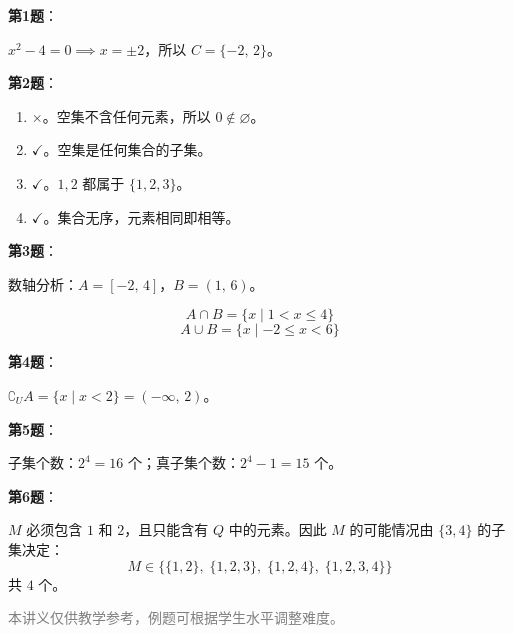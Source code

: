 \documentclass[12pt, a4paper]{ctexart}
\begin{document}
\begin{knowledgebox}[参考答案]
\textbf{第1题}：

$x^2 - 4 = 0 \implies x = \pm 2$，所以 $C = \{-2,\, 2\}$。

\vspace{6pt}
\textbf{第2题}：
\begin{enumerate}[label=(\arabic*)]
  \item $\times$。空集不含任何元素，所以 $0 \notin \varnothing$。
  \item $\checkmark$。空集是任何集合的子集。
  \item $\checkmark$。$1,2$ 都属于 $\{1,2,3\}$。
  \item $\checkmark$。集合无序，元素相同即相等。
\end{enumerate}

\vspace{6pt}
\textbf{第3题}：

数轴分析：$A = [-2,\, 4]$，$B = (1,\, 6)$。

\[
A \cap B = \{x \mid 1 < x \leqslant 4\}
\]
\[
A \cup B = \{x \mid -2 \leqslant x < 6\}
\]

\vspace{6pt}
\textbf{第4题}：

$\complement_U A = \{x \mid x < 2\} = (-\infty,\, 2)$。

\vspace{6pt}
\textbf{第5题}：

子集个数：$2^4 = 16$ 个；真子集个数：$2^4 - 1 = 15$ 个。

\vspace{6pt}
\textbf{第6题}：

$M$ 必须包含 $1$ 和 $2$，且只能含有 $Q$ 中的元素。因此 $M$ 的可能情况由 $\{3,4\}$ 的子集决定：
\[
M \in \big\{\{1,2\},\;\{1,2,3\},\;\{1,2,4\},\;\{1,2,3,4\}\big\}
\]
共 $4$ 个。
\end{knowledgebox}

\vfill
\begin{center}
\small\textcolor{gray}{本讲义仅供教学参考，例题可根据学生水平调整难度。}
\end{center}
\end{document}
